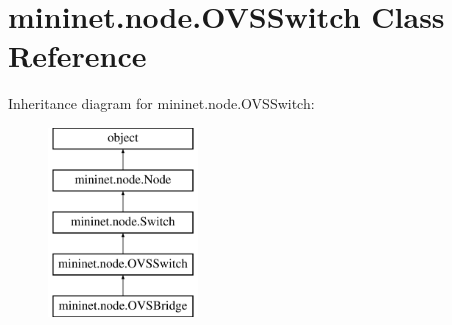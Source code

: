 \hypertarget{classmininet_1_1node_1_1OVSSwitch}{\section{mininet.\-node.\-O\-V\-S\-Switch Class Reference}
\label{classmininet_1_1node_1_1OVSSwitch}
}
Inheritance diagram for mininet.\-node.\-O\-V\-S\-Switch\-:\begin{figure}[H]
\begin{center}
\leavevmode
\includegraphics[height=5.000000cm]{classmininet_1_1node_1_1OVSSwitch}
\end{center}
\end{figure}
